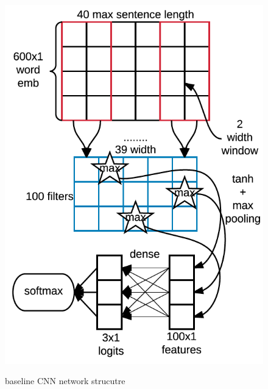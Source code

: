 \begin{figure}[h]
\centering
\begin{minipage}{.5\textwidth}
  \centering
  \includegraphics[width=1\linewidth]{cnn}
    \label{fig:cnn}
\end{minipage}%
\caption{baseline CNN network strucutre}
\end{figure}

